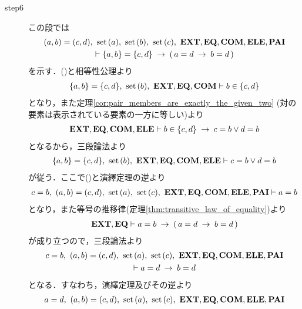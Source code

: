 \begin{sketch}
\begin{description}
			\item[step6] この段では
				\begin{align}
					\begin{gathered}
						(a,b) = (c,d),\ \set{a},\ \set{b},\ \set{c},\ 
						\EXTAX,\EQAX,\COMAX,\ELEAX,\PAIAX \\ 
						\vdash \{a,b\} = \{c,d\} \rarrow (\, a = d \rarrow b = d\, )
					\end{gathered}
				\end{align}
				を示す．()と相等性公理より
				\begin{align}
					\{a,b\} = \{c,d\},\ \operatorname*{set}\hspace{0.15em}(b),\ \mbox{{\bf EXT}},\mbox{{\bf EQ}},\mbox{\bf COM} \vdash b \in \{c,d\}
				\end{align}
				となり，また定理\ref{cor:pair_members_are_exactly_the_given_two}
				(対の要素は表示されている要素の一方に等しい)より
				\begin{align}
					\mbox{{\bf EXT}},\mbox{{\bf EQ}},\mbox{\bf COM},\mbox{{\bf ELE}} \vdash b \in \{c,d\} \hspace{0.25em}\rightarrow\hspace{0.25em} c = b \vee d = b
				\end{align}
				となるから，三段論法より
				\begin{align}
					\{a,b\} = \{c,d\},\ \set{b},\ \EXTAX,\EQAX,\COMAX,\ELEAX \vdash c = b \vee d = b
					\label{fom:equality_of_ordered_pairs_10}
				\end{align}
				が従う．ここで()と演繹定理の逆より
				\begin{align}
					c = b,\ (a,b) = (c,d),\ \set{a},\ \set{c},\ \EXTAX,\EQAX,\COMAX,\ELEAX,\PAIAX \vdash a = b
				\end{align}
				となり，また等号の推移律(定理\ref{thm:transitive_law_of_equality})より
				\begin{align}
					\mbox{{\bf EXT}},\mbox{{\bf EQ}} \vdash a = b \hspace{0.25em}\rightarrow\hspace{0.25em} (\, a = d \hspace{0.25em}\rightarrow\hspace{0.25em} b = d\, )
				\end{align}
				が成り立つので，三段論法より
				\begin{align}
					\begin{gathered}
						c = b,\ (a,b) = (c,d),\ \set{a},\ \set{c},\ \EXTAX,\EQAX,\COMAX,\ELEAX,\PAIAX \\
						\vdash a = d \rarrow b = d
					\end{gathered}
				\end{align}
				となる．すなわち，演繹定理及びその逆より
				\begin{align}
					\begin{gathered}
						a = d,\ (a,b) = (c,d),\ \set{a},\ \set{c},\ \EXTAX,\EQAX,\COMAX,\ELEAX,\PAIAX \\

\end{gathered}
\end{align}
\end{description}
\end{sketch}
